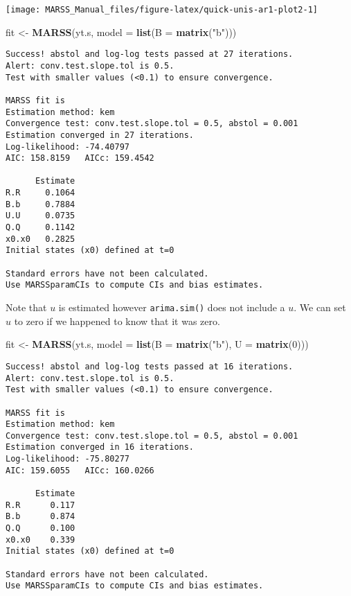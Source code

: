 \documentclass[12pt,]{book}
\newenvironment{Shaded}{\begin{snugshade}}{\end{snugshade}}
\newcommand{\DataTypeTok}[1]{\textcolor[rgb]{0.13,0.29,0.53}{#1}}
\newcommand{\DecValTok}[1]{\textcolor[rgb]{0.00,0.00,0.81}{#1}}
\newcommand{\KeywordTok}[1]{\textcolor[rgb]{0.13,0.29,0.53}{\textbf{#1}}}
\newcommand{\NormalTok}[1]{#1}
\newcommand{\StringTok}[1]{\textcolor[rgb]{0.31,0.60,0.02}{#1}}
\begin{document}
\begin{center}\texttt{[image: MARSS\_Manual\_files/figure-latex/quick-unis-ar1-plot2-1]} \end{center}

\begin{Shaded}
\begin{Highlighting}[]
\NormalTok{fit <-}\StringTok{ }\KeywordTok{MARSS}\NormalTok{(yt.s, }\DataTypeTok{model =} \KeywordTok{list}\NormalTok{(}\DataTypeTok{B =} \KeywordTok{matrix}\NormalTok{(}\StringTok{"b"}\NormalTok{)))}
\end{Highlighting}
\end{Shaded}

\begin{verbatim}
Success! abstol and log-log tests passed at 27 iterations.
Alert: conv.test.slope.tol is 0.5.
Test with smaller values (<0.1) to ensure convergence.

MARSS fit is
Estimation method: kem 
Convergence test: conv.test.slope.tol = 0.5, abstol = 0.001
Estimation converged in 27 iterations. 
Log-likelihood: -74.40797 
AIC: 158.8159   AICc: 159.4542   
 
      Estimate
R.R     0.1064
B.b     0.7884
U.U     0.0735
Q.Q     0.1142
x0.x0   0.2825
Initial states (x0) defined at t=0

Standard errors have not been calculated. 
Use MARSSparamCIs to compute CIs and bias estimates.
\end{verbatim}

Note that \(u\) is estimated however \texttt{arima.sim()} does not include a \(u\). We can set \(u\) to zero if we happened to know that it was zero.

\begin{Shaded}
\begin{Highlighting}[]
\NormalTok{fit <-}\StringTok{ }\KeywordTok{MARSS}\NormalTok{(yt.s, }\DataTypeTok{model =} \KeywordTok{list}\NormalTok{(}\DataTypeTok{B =} \KeywordTok{matrix}\NormalTok{(}\StringTok{"b"}\NormalTok{), }\DataTypeTok{U =} \KeywordTok{matrix}\NormalTok{(}\DecValTok{0}\NormalTok{)))}
\end{Highlighting}
\end{Shaded}

\begin{verbatim}
Success! abstol and log-log tests passed at 16 iterations.
Alert: conv.test.slope.tol is 0.5.
Test with smaller values (<0.1) to ensure convergence.

MARSS fit is
Estimation method: kem 
Convergence test: conv.test.slope.tol = 0.5, abstol = 0.001
Estimation converged in 16 iterations. 
Log-likelihood: -75.80277 
AIC: 159.6055   AICc: 160.0266   
 
      Estimate
R.R      0.117
B.b      0.874
Q.Q      0.100
x0.x0    0.339
Initial states (x0) defined at t=0

Standard errors have not been calculated. 
Use MARSSparamCIs to compute CIs and bias estimates.
\end{verbatim}
\end{document}
